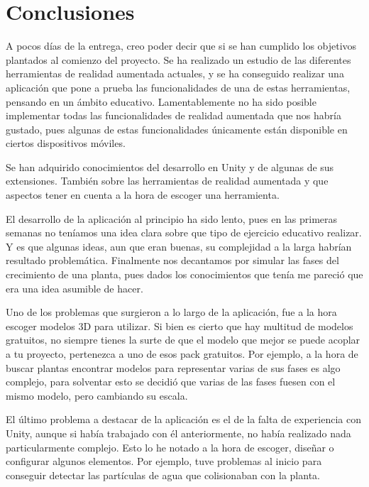 

\section{Conclusiones}
A pocos días de la entrega, creo poder decir que si se han cumplido los objetivos plantados al comienzo del proyecto. Se ha realizado un estudio de las diferentes herramientas de realidad aumentada actuales, y se ha conseguido realizar una aplicación que pone a prueba las funcionalidades de una de estas herramientas, pensando en un ámbito educativo. Lamentablemente no ha sido posible implementar todas las funcionalidades de realidad aumentada que nos habría gustado, pues algunas de estas funcionalidades únicamente están disponible en ciertos dispositivos móviles.

Se han adquirido conocimientos del desarrollo en Unity y de algunas de sus extensiones. También sobre las herramientas de realidad aumentada y que aspectos tener en cuenta a la hora de escoger una herramienta.

El desarrollo de la aplicación al principio ha sido lento, pues en las primeras semanas no teníamos una idea clara sobre que tipo de ejercicio educativo realizar. Y es que algunas ideas, aun que eran buenas, su complejidad a la larga habrían resultado problemática. Finalmente nos decantamos por simular las fases del crecimiento de una planta, pues dados los conocimientos que tenía me pareció que era una idea asumible de hacer.

Uno de los problemas que surgieron a lo largo de la aplicación, fue a la hora escoger modelos 3D para utilizar. Si bien es cierto que hay multitud de modelos gratuitos, no siempre tienes la surte de que el modelo que mejor se puede acoplar a tu proyecto, pertenezca a uno de esos pack gratuitos. Por ejemplo, a la hora de buscar plantas encontrar modelos para representar varias de sus fases es algo complejo, para solventar esto se decidió que varias de las fases fuesen con el mismo modelo, pero cambiando su escala.

El último problema a destacar de la aplicación es el de la falta de experiencia con Unity, aunque si había trabajado con él anteriormente, no había realizado nada particularmente complejo. Esto lo he notado a la hora de escoger, diseñar o configurar algunos elementos. Por ejemplo, tuve problemas al inicio para conseguir detectar las partículas de agua que colisionaban con la planta.


